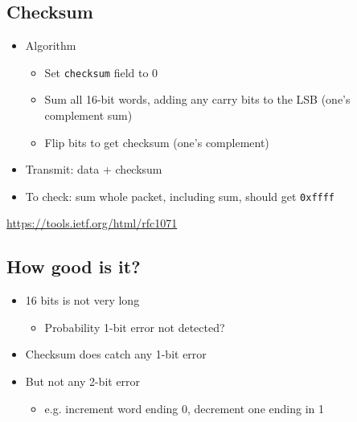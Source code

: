 \subsection{Checksum}
\begin{itemize}[nosep]
    \item Algorithm
          \begin{itemize}[nosep]
              \item Set \texttt{checksum} field to 0
              \item Sum all 16-bit words, adding any carry bits to the LSB (one's complement sum)
              \item Flip bits to get checksum (one's complement)
          \end{itemize}
    \item Transmit: data + checksum
    \item To check: sum whole packet, including sum, should get \texttt{0xffff}
\end{itemize}
\url{https://tools.ietf.org/html/rfc1071}
\subsection{How good is it?}
\begin{itemize}[nosep]
    \item 16 bits is not very long
          \begin{itemize}[nosep]
              \item Probability 1-bit error not detected?
          \end{itemize}
    \item Checksum does catch any 1-bit error
    \item But not any 2-bit error
          \begin{itemize}[nosep]
              \item e.g. increment word ending 0, decrement one ending in 1
          \end{itemize}
\end{itemize}

